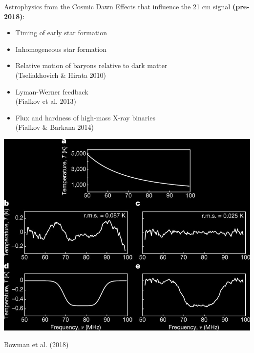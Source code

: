 \documentclass{beamer}
\begin{document}
\begin{frame}{Astrophysics from the Cosmic Dawn}
    Effects that influence the 21 cm signal \textbf{(pre-2018)}:
    \begin{itemize}[label=\textbullet]
        \item Timing of early star formation
        \item Inhomogeneous star formation
        \item Relative motion of baryons relative to dark matter\\
            {\tiny(Tseliakhovich \& Hirata 2010)}
        \item Lyman-Werner feedback\\
            {\tiny(Fialkov et al. 2013)}
        \item Flux and hardness of high-mass X-ray binaries\\
            {\tiny(Fialkov \& Barkana 2014)}
    \end{itemize}
\end{frame}

\begin{frame}
    \begin{center}
        \includegraphics[height=0.9\textheight]{figures/bowman-2018-absorption-trough.jpg}
    \end{center}
    \begin{center}
        \tiny{Bowman et al. (2018)}
    \end{center}
\end{frame}
\end{document}
